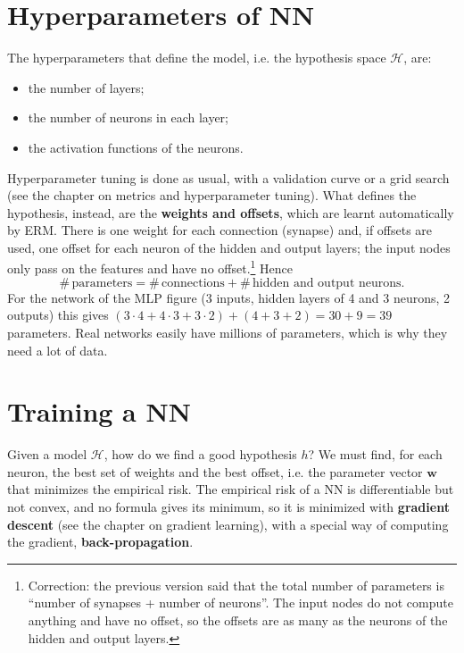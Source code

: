 \section{Hyperparameters of NN}
The hyperparameters that define the model, i.e. the hypothesis space $\mathcal{H}$, are:
\begin{itemize}
    \item the number of layers;
    \item the number of neurons in each layer;
    \item the activation functions of the neurons.
\end{itemize}
Hyperparameter tuning is done as usual, with a validation curve or a grid search (see the chapter on metrics and hyperparameter tuning). What defines the hypothesis, instead, are the \textbf{weights and offsets}, which are learnt automatically by ERM. There is one weight for each connection (synapse) and, if offsets are used, one offset for each neuron of the hidden and output layers; the input nodes only pass on the features and have no offset.\footnote{Correction: the previous version said that the total number of parameters is ``number of synapses + number of neurons''. The input nodes do not compute anything and have no offset, so the offsets are as many as the neurons of the hidden and output layers.} Hence
\[
\#\,\text{parameters} = \#\,\text{connections} + \#\,\text{hidden and output neurons}.
\]
For the network of the MLP figure (3 inputs, hidden layers of 4 and 3 neurons, 2 outputs) this gives $(3 \cdot 4 + 4 \cdot 3 + 3 \cdot 2) + (4 + 3 + 2) = 30 + 9 = 39$ parameters. Real networks easily have millions of parameters, which is why they need a lot of data.

\section{Training a NN}
Given a model $\mathcal{H}$, how do we find a good hypothesis $h$? We must find, for each neuron, the best set of weights and the best offset, i.e. the parameter vector $\mathbf{w}$ that minimizes the empirical risk. The empirical risk of a NN is differentiable but not convex, and no formula gives its minimum, so it is minimized with \textbf{gradient descent} (see the chapter on gradient learning), with a special way of computing the gradient, \textbf{back-propagation}.

